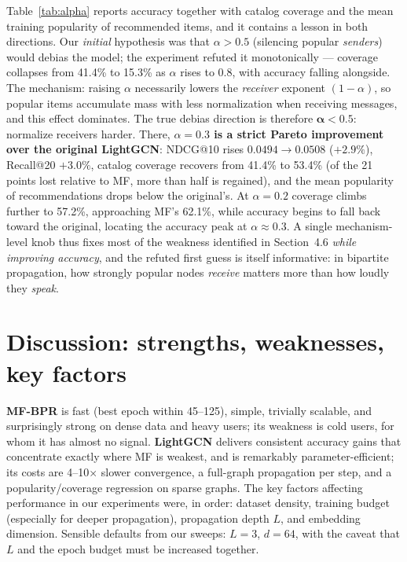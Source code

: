 \documentclass[11pt]{article}
\begin{document}
\begin{table}[h]\centering

\caption{Degree-$\alpha$ sweep on Video Games ($L{=}3$, $d{=}64$, 600-epoch
budget). Accuracy and beyond-accuracy metrics of the recommendation lists.}
\label{tab:alpha}
\end{table}

Table~\ref{tab:alpha} reports accuracy together with catalog coverage and the
mean training popularity of recommended items, and it contains a lesson in
both directions. Our \emph{initial} hypothesis was that $\alpha > 0.5$
(silencing popular \emph{senders}) would debias the model; the experiment
refuted it monotonically --- coverage collapses from 41.4\% to 15.3\% as
$\alpha$ rises to 0.8, with accuracy falling alongside. The mechanism:
raising $\alpha$ necessarily lowers the \emph{receiver} exponent $(1-\alpha)$,
so popular items accumulate mass with less normalization when receiving
messages, and this effect dominates. The true debias direction is therefore
$\boldsymbol{\alpha < 0.5}$: normalize receivers harder. There,
\textbf{$\alpha{=}0.3$ is a strict Pareto improvement over the original
LightGCN}: NDCG@10 rises $0.0494\!\rightarrow\!0.0508$ ($+2.9\%$), Recall@20
$+3.0\%$, catalog coverage recovers from 41.4\% to 53.4\% (of the 21 points
lost relative to MF, more than half is regained), and the mean popularity of
recommendations drops below the original's. At $\alpha{=}0.2$ coverage climbs
further to 57.2\%, approaching MF's 62.1\%, while accuracy begins to
fall back toward the original, locating the accuracy peak at
$\alpha\!\approx\!0.3$. A single mechanism-level knob thus fixes most of the
weakness identified in Section~4.6 \emph{while improving accuracy}, and the
refuted first guess is itself informative: in bipartite propagation, how
strongly popular nodes \emph{receive} matters more than how loudly they
\emph{speak}.

\section{Discussion: strengths, weaknesses, key factors}

\textbf{MF-BPR} is fast (best epoch within 45--125), simple, trivially
scalable, and surprisingly strong on dense data and heavy users; its weakness
is cold users, for whom it has almost no signal. \textbf{LightGCN} delivers
consistent accuracy gains that concentrate exactly where MF is weakest, and is
remarkably parameter-efficient; its costs are 4--10$\times$ slower
convergence, a full-graph propagation per step, and a popularity/coverage
regression on sparse graphs. The key factors affecting performance in our
experiments were, in order: dataset density, training budget (especially for
deeper propagation), propagation depth $L$, and embedding dimension. Sensible
defaults from our sweeps: $L{=}3$, $d{=}64$, with the caveat that $L$ and the
epoch budget must be increased together.
\end{document}
